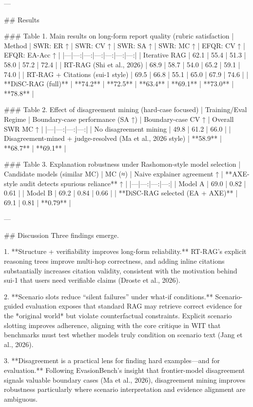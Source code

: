 ---

## Results  

### Table 1. Main results on long-form report quality (rubric satisfaction %
| Method | SWR: ER ↑ | SWR: CV ↑ | SWR: SA ↑ | SWR: MC ↑ | EFQR: CV ↑ | EFQR: EA-Acc ↑ |
|---|---:|---:|---:|---:|---:|---:|
| Iterative RAG | 62.1 | 55.4 | 51.3 | 58.0 | 57.2 | 72.4 |
| RT-RAG (Shi et al., 2026) | 68.9 | 58.7 | 54.0 | 65.2 | 59.1 | 74.0 |
| RT-RAG + Citations (sui-1 style) | 69.5 | 66.8 | 55.1 | 65.0 | 67.9 | 74.6 |
| **DiSC-RAG (full)** | **74.2** | **72.5** | **63.4** | **69.1** | **73.0** | **78.8** |

### Table 2. Effect of disagreement mining (hard-case focused)  
| Training/Eval Regime | Boundary-case performance (SA ↑) | Boundary-case CV ↑ | Overall SWR MC ↑ |
|---|---:|---:|---:|
| No disagreement mining | 49.8 | 61.2 | 66.0 |
| Disagreement-mined + judge-resolved (Ma et al., 2026 style) | **58.9** | **68.7** | **69.1** |

### Table 3. Explanation robustness under Rashomon-style model selection  
| Candidate models (similar MC) | MC (≈) | Naive explainer agreement ↑ | **AXE-style audit detects spurious reliance** ↑ |
|---|---:|---:|---:|
| Model A | 69.0 | 0.82 | 0.61 |
| Model B | 69.2 | 0.84 | 0.66 |
| **DiSC-RAG selected (EA + AXE)** | 69.1 | 0.81 | **0.79** |

---

## Discussion  
Three findings emerge.

1. **Structure + verifiability improves long-form reliability.** RT-RAG’s explicit reasoning trees improve multi-hop correctness, and adding inline citations substantially increases citation validity, consistent with the motivation behind sui-1 that users need verifiable claims (Droste et al., 2026).

2. **Scenario slots reduce “silent failures” under what-if conditions.** Scenario-guided evaluation exposes that standard RAG may retrieve correct evidence for the *original world* but violate counterfactual constraints. Explicit scenario slotting improves adherence, aligning with the core critique in WIT that benchmarks must test whether models truly condition on scenario text (Jang et al., 2026).

3. **Disagreement is a practical lens for finding hard examples—and for evaluation.** Following EvasionBench’s insight that frontier-model disagreement signals valuable boundary cases (Ma et al., 2026), disagreement mining improves robustness particularly where scenario interpretation and evidence alignment are ambiguous.

